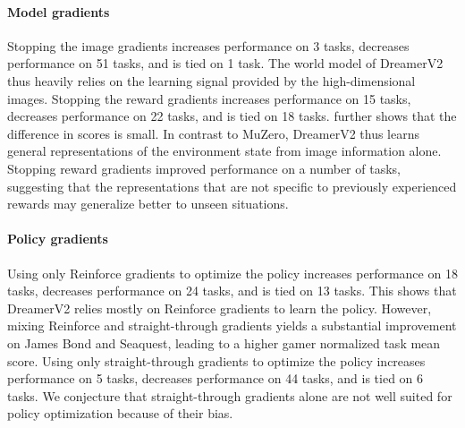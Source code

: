 \paragraph{Model gradients}

Stopping the image gradients increases performance on 3 tasks, decreases performance on 51 tasks, and is tied on 1 task. The world model of DreamerV2 thus heavily relies on the learning signal provided by the high-dimensional images. Stopping the reward gradients increases performance on 15 tasks, decreases performance on 22 tasks, and is tied on 18 tasks.  further shows that the difference in scores is small. In contrast to MuZero, DreamerV2 thus learns general representations of the environment state from image information  alone. Stopping reward gradients improved performance on a number of tasks, suggesting that the representations that are not specific to previously experienced rewards may generalize better to unseen situations.

\paragraph{Policy gradients}

Using only Reinforce gradients to optimize the policy increases performance on 18 tasks, decreases performance on 24 tasks, and is tied on 13 tasks. This shows that DreamerV2 relies mostly on Reinforce gradients to learn the policy. However, mixing Reinforce and straight-through gradients yields a substantial improvement on James Bond and Seaquest, leading to a higher gamer normalized task mean score. Using only straight-through gradients to optimize the policy increases performance on 5 tasks, decreases performance on 44 tasks, and is tied on 6 tasks. We conjecture that straight-through gradients alone are not well suited for policy optimization because of their bias.
